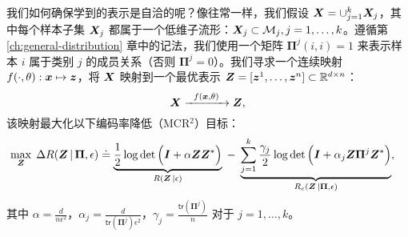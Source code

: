 \documentclass[../../book-main_zh.tex]{subfiles}
\begin{document}

我们如何确保学到的表示是自洽的呢？像往常一样，我们假设 $\bm{X} = \cup_{j=1}^k \bm{X}_j$，其中每个样本子集 $\bm{X}_j$ 都属于一个低维子流形：$\bm{X}_j \subset \mathcal{M}_j, j = 1,\ldots, k$。遵循第 \ref{ch:general-distribution} 章中的记法，我们使用一个矩阵 $\bm \Pi^j(i,i) = 1$ 来表示样本 $i$ 属于类别 $j$ 的成员关系（否则 $\bm \Pi^j = 0$）。我们寻求一个连续映射 $f(\cdot,\theta): \bm{x} \mapsto \bm{z}$，将 $\bm{X}$ 映射到一个最优表示 $\bm{Z} = [\bm{z}^1, \ldots, \bm{z}^n] \subset \mathbb{R}^{d \times n}$：
\begin{equation}
\bm X  \xrightarrow{\hspace{2mm} f(\bm{x}, \theta)\hspace{2mm}} \bm Z, 
\label{eqn:LDR}
\end{equation}
该映射最大化以下编码率降低（MCR$^2$）目标：
\begin{equation}\label{eq:mcr2-formulation}
\begin{split}
\max_{\Z} \; \Delta R(\Z\, | \, \bm{\Pi}, \epsilon) %
&\doteq \underbrace{\frac{1}{2}\log\det \Big(\I + {\alpha} \Z \Z^{*} \Big)}_{R(\Z\, | \epsilon)} \;-\; \underbrace{\sum_{j=1}^{k}\frac{\gamma_j}{2} \log\det\Big(\I + {\alpha_j} \Z \bm{\Pi}^{j} \Z^{*} \Big)}_{R_c(\Z \,|\bm \Pi, \epsilon)},
\end{split}
\end{equation}
其中 $\alpha=\frac{d}{n\epsilon^2}$，$\alpha_j=\frac{d}{\textsf{tr}(\bm{\Pi}^{j})\epsilon^2}$，$\gamma_j=\frac{\textsf{tr}(\bm{\Pi}^{j})}{n}$ 对于 $j = 1,\ldots, k$。
\end{document}
